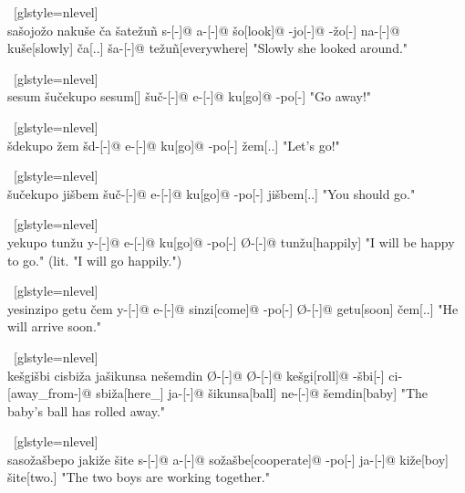 \ex~[glstyle=nlevel]
\begingl
\glpreamble {} \\ sa\v{s}ojo\v{z}o naku\v{s}e \v{c}a \v{s}ate\v{z}uñ
\endpreamble
s-[{\Ind}-]@
a-[{\Prog}-]@
\v{s}o[look]@
-jo[-{\Hg}]@
-\v{z}o[-{\Inan}]
na-[{\Prog}-]@
ku\v{s}e[slowly]
\v{c}a[{\T}.{\Hg}.{\Erg}]
\v{s}a-[{\Acc}-]@
te\v{z}uñ[everywhere]
\glft "Slowly she looked around."
\endgl
\xe

\ex~[glstyle=nlevel]
\begingl
\glpreamble {} \\ sesum \v{s}u\v{c}ekupo
\endpreamble
sesum[\Imp]
\v{s}u\v{c}-[{\Deo}-]@
e-[{\Pfv}-]@
ku[go]@
-po[-{\Hg}]
\glft "Go away!"
\endgl
\xe

\ex~[glstyle=nlevel]
\begingl
\glpreamble {} \\ \v{s}dekupo \v{z}em
\endpreamble
\v{s}d-[{\Opt}-]@
e-[{\Pfv}-]@
ku[go]@
-po[-{\Hg}]
\v{z}em[{\Fin}.{\Hg}.{\Nom}]
\glft "Let's go!"
\endgl
\xe

\ex~[glstyle=nlevel]
\begingl
\glpreamble {} \\ \v{s}u\v{c}ekupo ji\v{s}bem
\endpreamble
\v{s}u\v{c}-[{\Deo}-]@
e-[{\Pfv}-]@
ku[go]@
-po[-{\Hg}]
ji\v{s}bem[{\Spol}.{\Hg}.{\Nom}]
\glft "You should go."
\endgl
\xe

\ex~[glstyle=nlevel]
\begingl
\glpreamble {} \\ yekupo tun\v{z}u
\endpreamble
y-[{\Subj}-]@
e-[{\Pfv}-]@
ku[go]@
-po[-{\Hg}]
Ø-[{\Pfv}-]@
tun\v{z}u[happily]
\glft "I will be happy to go." (lit. "I will go happily.")
\endgl
\xe

\ex~[glstyle=nlevel]
\begingl
\glpreamble {} \\ yesinzipo getu \v{c}em
\endpreamble
y-[{\Subj}-]@
e-[{\Pfv}-]@
sinzi[come]@
-po[-{\Hg}]
Ø-[{\Pfv}-]@
getu[soon]
\v{c}em[{\T}.{\Hg}.{\Nom}]
\glft "He will arrive soon."
\endgl
\xe

\ex~[glstyle=nlevel]
\begingl
\glpreamble {} \\ ke\v{s}gi\v{s}bi cisbi\v{z}a ja\v{s}ikunsa ne\v{s}emdin
\endpreamble
Ø-[{\Ind}-]@
Ø-[{\Pfv}-]@
ke\v{s}gi[roll]@
-\v{s}bi[-{\Inan}]
ci-[away\_from-]@
sbi\v{z}a[here\_{\Prox}]
ja-[{\Nom}-]@
\v{s}ikunsa[ball]
ne-[{\Gen}-]@
\v{s}emdin[baby]
\glft "The baby's ball has rolled away."
\endgl
\xe

\ex~[glstyle=nlevel]
\begingl
\glpreamble {} \\ saso\v{z}a\v{s}bepo jaki\v{z}e \v{s}ite
\endpreamble
s-[{\Ind}-]@
a-[{\Prog}-]@
so\v{z}a\v{s}be[cooperate]@
-po[-{\Hg}]
ja-[{\Nom}-]@
ki\v{z}e[boy]
\v{s}ite[two.{\Hg}]
\glft "The two boys are working together."
\endgl
\xe

